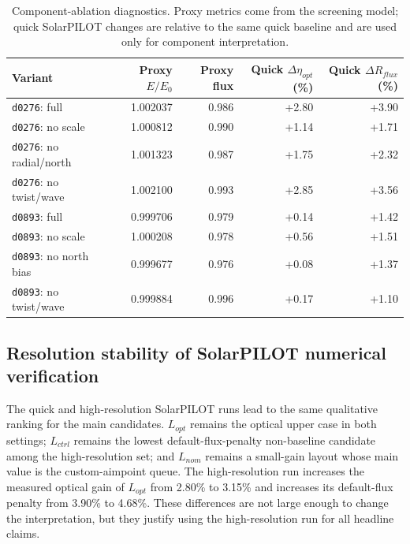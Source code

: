 \documentclass[final,3p,times]{elsarticle}
\begin{document}
\begin{table}[t]
\centering
\caption{Component-ablation diagnostics. Proxy metrics come from the screening model; quick SolarPILOT changes are relative to the same quick baseline and are used only for component interpretation.}
\label{tab:ablation}
\scriptsize
\begin{tabular*}{\textwidth}{@{\extracolsep{\fill}}lrrrr@{}}
\toprule
Variant & Proxy $E/E_0$ & Proxy flux & Quick $\Delta\eta_{opt}$ (\%) & Quick $\Delta R_{flux}$ (\%) \\
\midrule
\texttt{d0276}: full & 1.002037 & 0.986 & +2.80 & +3.90 \\
\texttt{d0276}: no scale & 1.000812 & 0.990 & +1.14 & +1.71 \\
\texttt{d0276}: no radial/north & 1.001323 & 0.987 & +1.75 & +2.32 \\
\texttt{d0276}: no twist/wave & 1.002100 & 0.993 & +2.85 & +3.56 \\
\texttt{d0893}: full & 0.999706 & 0.979 & +0.14 & +1.42 \\
\texttt{d0893}: no scale & 1.000208 & 0.978 & +0.56 & +1.51 \\
\texttt{d0893}: no north bias & 0.999677 & 0.976 & +0.08 & +1.37 \\
\texttt{d0893}: no twist/wave & 0.999884 & 0.996 & +0.17 & +1.10 \\
\bottomrule
\end{tabular*}
\end{table}

\subsection{Resolution stability of SolarPILOT numerical verification}
The quick and high-resolution SolarPILOT runs lead to the same qualitative ranking for the main candidates. $L_{opt}$ remains the optical upper case in both settings; $L_{ctrl}$ remains the lowest default-flux-penalty non-baseline candidate among the high-resolution set; and $L_{nom}$ remains a small-gain layout whose main value is the custom-aimpoint queue. The high-resolution run increases the measured optical gain of $L_{opt}$ from 2.80\% to 3.15\% and increases its default-flux penalty from 3.90\% to 4.68\%. These differences are not large enough to change the interpretation, but they justify using the high-resolution run for all headline claims.
\end{document}
